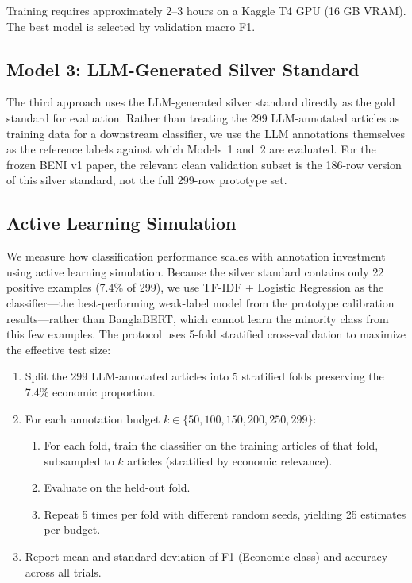 Training requires approximately 2--3 hours on a Kaggle T4 GPU (16 GB VRAM). The best model is selected by validation macro F1.

\subsection{Model 3: LLM-Generated Silver Standard}

The third approach uses the LLM-generated silver standard directly as the gold standard for evaluation. Rather than treating the 299 LLM-annotated articles as training data for a downstream classifier, we use the LLM annotations themselves as the reference labels against which Models~1 and~2 are evaluated. For the frozen BENI v1 paper, the relevant clean validation subset is the 186-row version of this silver standard, not the full 299-row prototype set.

\subsection{Active Learning Simulation}\label{sec:active-learning}

We measure how classification performance scales with annotation investment using active learning simulation. Because the silver standard contains only 22 positive examples (7.4\% of 299), we use TF-IDF + Logistic Regression as the classifier---the best-performing weak-label model from the prototype calibration results---rather than BanglaBERT, which cannot learn the minority class from this few examples. The protocol uses 5-fold stratified cross-validation to maximize the effective test size:

\begin{enumerate}
    \item Split the 299 LLM-annotated articles into 5 stratified folds preserving the 7.4\% economic proportion.
    \item For each annotation budget $k \in \{50, 100, 150, 200, 250, 299\}$:
    \begin{enumerate}
        \item For each fold, train the classifier on the training articles of that fold, subsampled to $k$ articles (stratified by economic relevance).
        \item Evaluate on the held-out fold.
        \item Repeat 5 times per fold with different random seeds, yielding 25 estimates per budget.
    \end{enumerate}
    \item Report mean and standard deviation of F1 (Economic class) and accuracy across all trials.
\end{enumerate}

